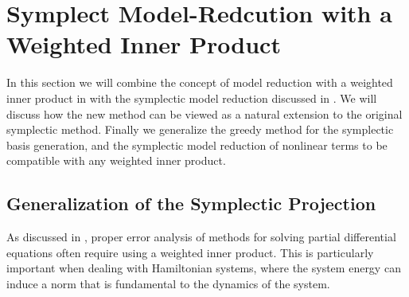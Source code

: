 \section{Symplect Model-Redcution with a Weighted Inner Product} \label{sec:normmor}

In this section we will combine the concept of model reduction with a weighted inner product in  with the symplectic model reduction discussed in . We will discuss how the new method can be viewed as a natural extension to the original symplectic method. Finally we generalize the greedy method for the symplectic basis generation, and the symplectic model reduction of nonlinear terms to be compatible with any weighted inner product.

\subsection{Generalization of the Symplectic Projection} \label{sec:normmor.1}
As discussed in , proper error analysis of methods for solving partial differential equations often require using a weighted inner product. This is particularly important when dealing with Hamiltonian systems, where the system energy can induce a norm that is fundamental to the dynamics of the system.

